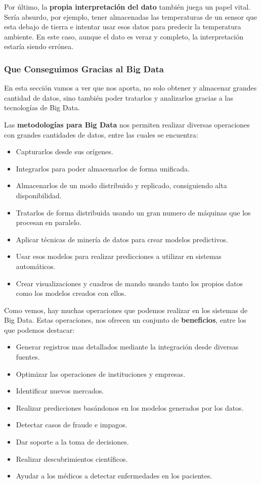 Por último, la \textbf{propia interpretación del dato} también juega un papel vital. Sería absurdo, por ejemplo, tener almacenadas las temperaturas de un sensor que esta debajo de tierra e intentar usar esos datos para predecir la temperatura ambiente. En este caso, aunque el dato es veraz y completo, la interpretación estaría siendo errónea.

\subsubsection{Que Conseguimos Gracias al Big Data}
En esta sección vamos a ver que nos aporta, no solo obtener y almacenar grandes cantidad de datos, sino también poder tratarlos y analizarlos gracias a las tecnologías de Big Data.

Las \textbf{metodologías para Big Data} nos permiten realizar diversas operaciones con grandes cantidades de datos, entre las cuales se encuentra:

\begin{itemize}
	\item Capturarlos desde sus orígenes.
	\item Integrarlos para poder almacenarlos de forma unificada.
	\item Almacenarlos de un modo distribuido y replicado, consiguiendo alta disponibilidad.
	\item Tratarlos de forma distribuida usando un gran numero de máquinas que los procesan en paralelo.
	\item Aplicar técnicas de minería de datos para crear modelos predictivos.
	\item Usar esos modelos para realizar predicciones a utilizar en sistemas automáticos.
	\item Crear visualizaciones y cuadros de mando usando tanto los propios datos como los modelos creados con ellos.
\end{itemize}

Como vemos, hay muchas operaciones que podemos realizar en los sistemas de Big Data. Estas operaciones, nos ofrecen un conjunto de \textbf{beneficios}, entre los que podemos destacar:

\begin{itemize}
	\item Generar registros mas detallados mediante la integración desde diversas fuentes.
	\item Optimizar las operaciones de instituciones y empresas.
	\item Identificar nuevos mercados.
	\item Realizar predicciones basándonos en los modelos generados por los datos.
	\item Detectar casos de fraude e impagos.
	\item Dar soporte a la toma de decisiones.
	\item Realizar descubrimientos científicos.
	\item Ayudar a los médicos a detectar enfermedades en los pacientes.
\end{itemize}

